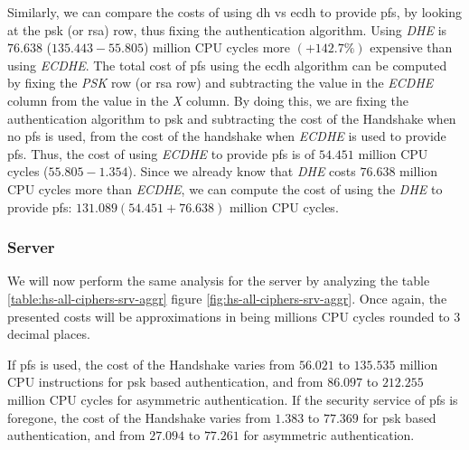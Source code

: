 \documentclass{llncs}
\begin{document}
Similarly, we can compare the costs of using \gls{dh} vs \gls{ecdh} to provide \gls{pfs}, by
looking at the \gls{psk} (or \gls{rsa}) row, thus fixing the authentication algorithm. Using \textit{DHE} is
$76.638$ ($135.443 - 55.805$) million CPU cycles more $(+142.7\%)$ expensive than using \textit{ECDHE}.
The total cost of \gls{pfs}
using the \gls{ecdh} algorithm can be computed by fixing the \textit{PSK} row (or \gls{rsa} row)
and subtracting the value in the \textit{ECDHE} column from the value in the \textit{X} column. By doing this, we are
fixing the authentication algorithm to \gls{psk} and subtracting the cost of the Handshake when no \gls{pfs} is used,
from the cost of the handshake when \textit{ECDHE} is used to provide \gls{pfs}. Thus, the cost of using \textit{ECDHE}
to provide \gls{pfs} is of $54.451$ million CPU cycles ($55.805-1.354$). Since we already know that \textit{DHE} costs
$76.638$ million CPU cycles more than \textit{ECDHE}, we can compute the cost of using the \textit{DHE} to
provide \gls{pfs}: $131.089 (54.451+76.638)$ million CPU cycles.

\subsubsection{Server}

We will now perform the same analysis for the server by analyzing the table \ref{table:hs-all-ciphers-srv-aggr}
figure \ref{fig:hs-all-ciphers-srv-aggr}. Once again, the presented costs will be approximations in
being millions CPU cycles rounded to $3$ decimal places.

If \gls{pfs} is used, the cost of the Handshake varies from $56.021$ to $135.535$
million CPU instructions for \gls{psk} based authentication, and from $86.097$ to $212.255$ million CPU cycles for
asymmetric authentication. If the security service of \gls{pfs} is foregone, the cost
of the Handshake varies from $1.383$  to $77.369$ for \gls{psk} based authentication,
and from $27.094$ to $77.261$ for asymmetric authentication.
\end{document}

